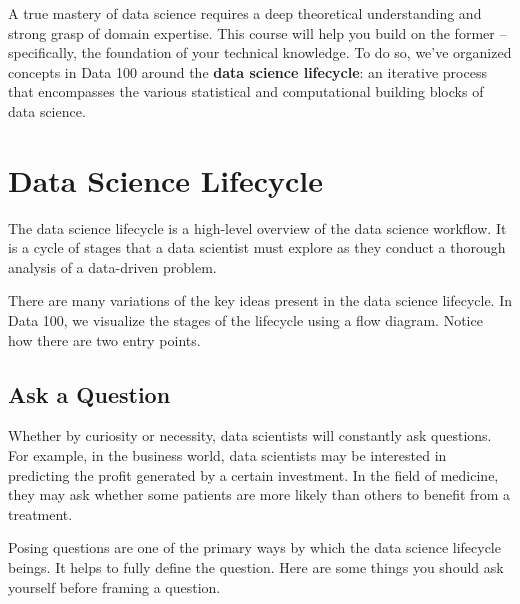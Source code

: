 \documentclass[
  letterpaper,
  DIV=11,
  numbers=noendperiod]{scrreprt}
\begin{document}
A true mastery of data science requires a deep theoretical understanding
and strong grasp of domain expertise. This course will help you build on
the former -- specifically, the foundation of your technical knowledge.
To do so, we've organized concepts in Data 100 around the \textbf{data
science lifecycle}: an iterative process that encompasses the various
statistical and computational building blocks of data science.

\hypertarget{data-science-lifecycle}{%
\section{Data Science Lifecycle}\label{data-science-lifecycle}}

The data science lifecycle is a high-level overview of the data science
workflow. It is a cycle of stages that a data scientist must explore as
they conduct a thorough analysis of a data-driven problem.

There are many variations of the key ideas present in the data science
lifecycle. In Data 100, we visualize the stages of the lifecycle using a
flow diagram. Notice how there are two entry points.

\hypertarget{ask-a-question}{%
\subsection{Ask a Question}\label{ask-a-question}}

Whether by curiosity or necessity, data scientists will constantly ask
questions. For example, in the business world, data scientists may be
interested in predicting the profit generated by a certain investment.
In the field of medicine, they may ask whether some patients are more
likely than others to benefit from a treatment.

Posing questions are one of the primary ways by which the data science
lifecycle beings. It helps to fully define the question. Here are some
things you should ask yourself before framing a question.
\end{document}
